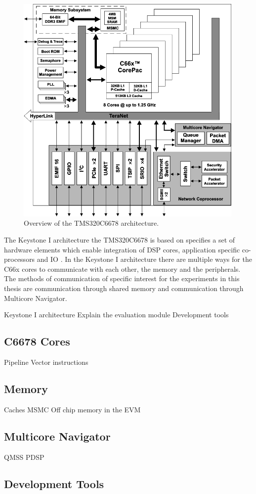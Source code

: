 \begin{figure}[h!]
    \label{arch_overview}
    \begin{center}
        \includegraphics[width=0.99\textwidth]{images/fbd_SPRS691e.png} 
        \caption{Overview of the TMS320C6678 architecture.}
    \end{center}
\end{figure}

The Keystone I architecture the TMS320C6678 is based on specifies a set
of hardware elements which enable integration of DSP cores, application 
specific co-processors and IO \cite{tmsdatasheet}. In the Keystone I 
architecture there are multiple ways for the C66x cores to communicate
with each other, the memory and the peripherals. The methods of
communication of specific interest for the experiments in this thesis
are communication through shared memory and communication through
Multicore Navigator.

Keystone I architecture
Explain the evaluation module
Development tools

\subsection{C6678 Cores}
Pipeline
Vector instructions
\subsection{Memory}
Caches
MSMC
Off chip memory in the EVM
\subsection{Multicore Navigator}
QMSS
PDSP
\subsection{Development Tools}


